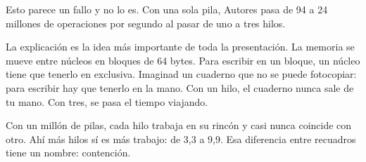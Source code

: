 Esto parece un fallo y no lo es. Con una sola pila, Autores pasa de 94 a 24 millones de operaciones por segundo al pasar de uno a tres hilos.

La explicación es la idea más importante de toda la presentación. La memoria se mueve entre núcleos en bloques de 64 bytes. Para escribir en un bloque, un núcleo tiene que tenerlo en exclusiva. Imaginad un cuaderno que no se puede fotocopiar: para escribir hay que tenerlo en la mano. Con un hilo, el cuaderno nunca sale de tu mano. Con tres, se pasa el tiempo viajando.

Con un millón de pilas, cada hilo trabaja en su rincón y casi nunca coincide con otro. Ahí más hilos sí es más trabajo: de 3,3 a 9,9. Esa diferencia entre recuadros tiene un nombre: contención.
